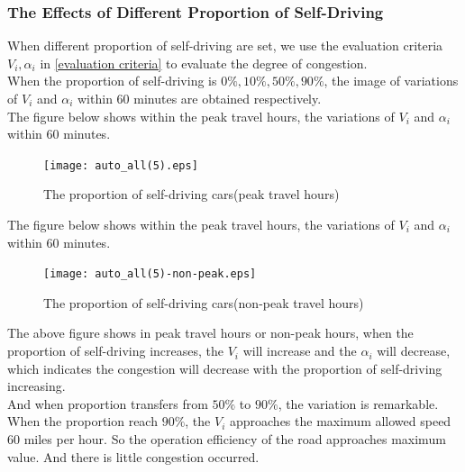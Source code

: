 \documentclass[UTF8]{mcmthesis}
\begin{document}
\subsubsection{The Effects of Different Proportion of Self-Driving }
When different proportion of self-driving are set, we use the evaluation criteria $V_{i}, \alpha_{i}$ in \ref{evaluation criteria} to evaluate the degree of congestion. \\
\indent When the proportion of self-driving is $0\%, 10\%, 50\%, 90\%$, the image of variations of $V_{i}$ and $\alpha_{i}$ within 60 minutes are obtained respectively.\\
\indent The figure below shows within the peak travel hours, the variations of $V_{i}$ and $\alpha_{i}$ within 60 minutes.\\
\begin{figure}[H]
	\centerline{\texttt{[image: auto\_all(5).eps]}}
	\caption{The proportion of self-driving cars(peak travel hours)}	
\end{figure}
\indent The figure below shows within the peak travel hours, the variations of $V_{i}$ and $\alpha_{i}$ within 60 minutes.\\
\begin{figure}[H]
	\centerline{\texttt{[image: auto\_all(5)-non-peak.eps]}}
	\caption{The proportion of self-driving cars(non-peak travel hours)}	
\end{figure}
\indent The above figure shows in peak travel hours or non-peak hours, when the proportion of self-driving increases, the $V_{i}$ will increase and the $\alpha_{i}$ will decrease, which indicates the congestion will decrease with the proportion of self-driving increasing.\\
\indent And when proportion transfers from $50\% $ to $90\% $, the variation is remarkable. When the proportion reach $90\%$, the $V_{i}$ approaches the maximum allowed speed 60 miles per hour. So the operation efficiency of the road approaches maximum value. And there is little congestion occurred. \\
\end{document}
